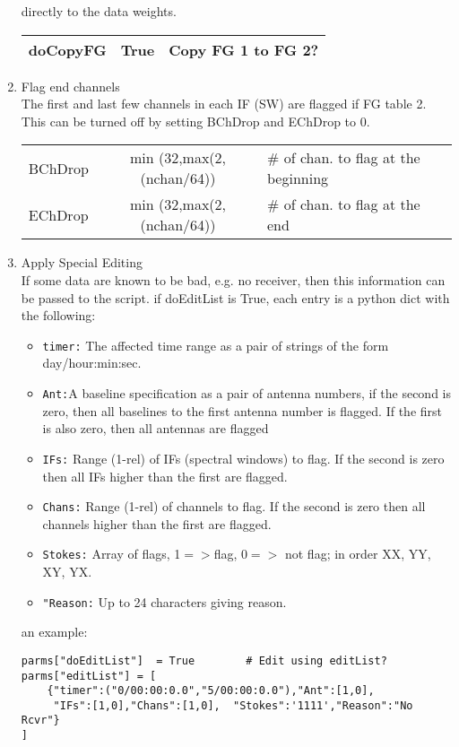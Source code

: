 \documentclass[11pt]{article}
\begin{document}
\begin{enumerate}
directly to the data weights.
\begin{center}
\begin{tabular}{|l|c|l|}
\hline
doCopyFG  & True & Copy FG 1 to FG 2? \\
\hline
\end{tabular}
\end{center}
%
\item Flag end channels\\
The first and last few channels in each IF (SW) are flagged if FG table 2.
This can be turned off by setting BChDrop and EChDrop to 0.
\begin{center}
\begin{tabular}{|l|c|l|}
\hline
BChDrop  & min (32,max(2, (nchan/64)) & \# of chan. to flag at the beginning \\
EChDrop  & min (32,max(2, (nchan/64)) & \# of chan. to flag at the end \\
\hline
\end{tabular}
\end{center}
%
%
\item Apply Special Editing\\
If some data are known to be bad, e.g. no receiver, then this
information can be passed to the script.
if doEditList is True, each entry is a python dict with the following:
\begin{itemize}
\item{\tt timer:} The affected time range as a pair of strings of the
form day/hour:min:sec.
\item{\tt Ant:}A baseline specification as a pair of antenna numbers,
if the second is zero, then all baselines to the first antenna number
is flagged.  
If the first is also zero, then all antennas are flagged
\item{\tt IFs:} Range (1-rel)  of IFs (spectral windows) to flag.
If the second is zero then all IFs higher than the first are flagged.
\item{\tt Chans:} Range (1-rel) of channels to flag.
If the second is zero then all channels higher than the first are flagged.
\item{\tt Stokes:} Array of flags, 1$=>$flag, $0=>$ not flag; in order
  XX, YY, XY, YX.
\item{\tt "Reason:} Up to 24 characters giving reason.
\end{itemize}
an example:
\begin{verbatim}
parms["doEditList"]  = True        # Edit using editList?
parms["editList"] = [
    {"timer":("0/00:00:0.0","5/00:00:0.0"),"Ant":[1,0],
     "IFs":[1,0],"Chans":[1,0],  "Stokes":'1111',"Reason":"No Rcvr"}
]
\end{verbatim}


\end{enumerate}
\end{document}
